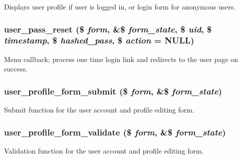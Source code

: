 Displays user profile if user is logged in, or login form for anonymous users. \hypertarget{user_8pages_8inc_a41329f7d60f984554b8630fcba94b388}{
\subsubsection[{user\_\-pass\_\-reset}]{\setlength{\rightskip}{0pt plus 5cm}user\_\-pass\_\-reset (\$ {\em form}, \/  \&\$ {\em form\_\-state}, \/  \$ {\em uid}, \/  \$ {\em timestamp}, \/  \$ {\em hashed\_\-pass}, \/  \$ {\em action} = {\ttfamily NULL})}}
\label{user_8pages_8inc_a41329f7d60f984554b8630fcba94b388}
Menu callback; process one time login link and redirects to the user page on success. \hypertarget{user_8pages_8inc_ac10455f162f61cbf551fe7ec7b5c92cc}{
\subsubsection[{user\_\-profile\_\-form\_\-submit}]{\setlength{\rightskip}{0pt plus 5cm}user\_\-profile\_\-form\_\-submit (\$ {\em form}, \/  \&\$ {\em form\_\-state})}}
\label{user_8pages_8inc_ac10455f162f61cbf551fe7ec7b5c92cc}
Submit function for the user account and profile editing form. \hypertarget{user_8pages_8inc_afca5f516f0fadcb918e6d13dff66db76}{
\subsubsection[{user\_\-profile\_\-form\_\-validate}]{\setlength{\rightskip}{0pt plus 5cm}user\_\-profile\_\-form\_\-validate (\$ {\em form}, \/  \&\$ {\em form\_\-state})}}
\label{user_8pages_8inc_afca5f516f0fadcb918e6d13dff66db76}
Validation function for the user account and profile editing form. 